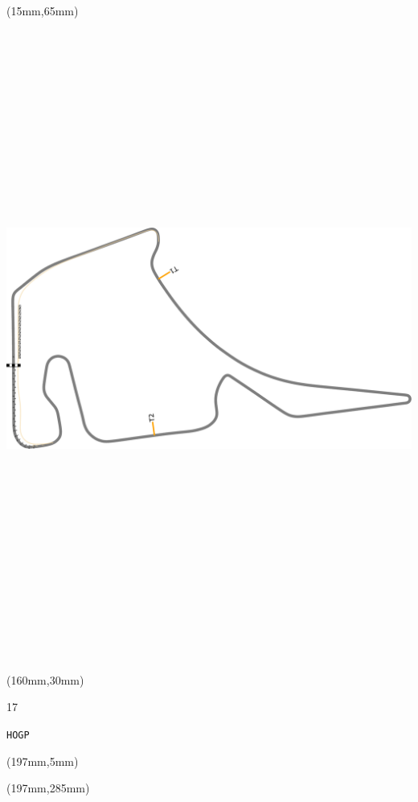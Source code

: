 \begin{textblock*}{185mm}(15mm,65mm)%
\centering
\mbox{\includegraphics[width=185mm,height=210mm,keepaspectratio]{PT/HOGP.pdf}}
\end{textblock*}
\begin{textblock*}{40mm}(160mm,30mm)%
\Large
\par{} 
\par17 
\par\hfill\tiny\tt HOGP\\
\end{textblock*}
\begin{textblock*}{20mm}(197mm,5mm)%
\fbox{\thepage}
\label{HOGP}
\end{textblock*}
\begin{textblock*}{20mm}(197mm,285mm)%
\fbox{\thepage}
\end{textblock*}

